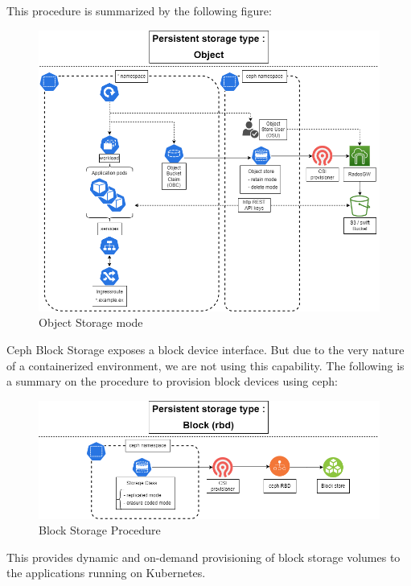 This procedure is summarized by the following figure: 

\begin{figure}[H]\centering
\includegraphics[width=1.0\textwidth,angle=00]{assets/f32.png}
\caption{Object Storage mode }
\label{fig:Object Storage mode}
\end{figure}
\newpage
{}

Ceph Block Storage exposes a block device interface. But due to the very nature of a containerized environment, we are not using this capability. The following is a summary on the procedure to provision block devices using ceph: 

\begin{figure}[H]\centering
\includegraphics[width=1.0\textwidth,angle=00]{assets/f33.png}
\caption{Block Storage Procedure}
\label{fig:Block Storage Procedure}
\end{figure}

This provides dynamic and on-demand provisioning of block storage volumes to the applications running on Kubernetes.


